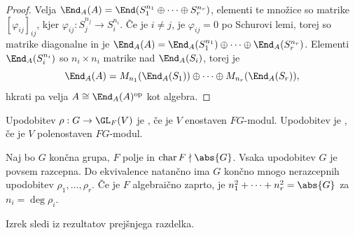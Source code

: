 \begin{proof}
  Velja $\End_A(A) = \End(S_1^{n_1} \oplus \cdots \oplus S_r^{n_r})$, elementi
  te množice so matrike $[\varphi_{ij}]_{ij}$, kjer $\varphi_{ij}: S_j^{n_j} \to
  S_i^{n_i}$.
  Če je $i \ne j$, je $\varphi_{ij} = 0$ po Schurovi lemi, torej so matrike
  diagonalne in je $\End_A(A) = \End_A(S_1^{n_1}) \oplus \cdots
  \oplus \End_A(S_r^{n_r})$.
  Elementi $\End_A(S_i^{n_i})$ so $n_i \times n_i$ matrike nad $\End_A(S_i)$,
  torej je
  \[
	\End_A(A) = M_{n_1}(\End_A(S_1)) \oplus \cdots \oplus M_{n_r}(\End_A(S_r)),
  \]
  hkrati pa velja $A \cong \End_A(A)^{\text{op}}$ kot algebra.
\end{proof}



\begin{definicija}
  Upodobitev $\rho: G \to \GL_F(V)$ je , če je $V$ enostaven
  $FG$-modul.
  Upodobitev je , če je $V$ polenostaven $FG$-modul.
\end{definicija}

\begin{izrek}
  Naj bo $G$ končna grupa, $F$ polje in $\operatorname{char} F \nmid \abs{G}$.
  Vsaka upodobitev $G$ je povsem razcepna.
  Do ekvivalence natančno ima $G$ končno mnogo nerazcepnih upodobitev $\rho_1,
  \ldots, \rho_r$.
  Če je $F$ algebraično zaprto, je $n_1^2 + \cdots + n_r^2 = \abs{G}$ za $n_i =
  \deg \rho_i$.
\end{izrek}

Izrek sledi iz rezultatov prejšnjega razdelka.

